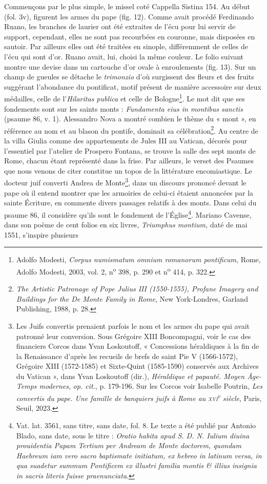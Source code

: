 \documentclass[12pt,twoside,openany]{book}
\begin{document}
Commençons par le plus simple, le missel coté Cappella Sistina 154. Au début (fol. 3v), figurent les armes du pape (fig. 12). Comme avait procédé Ferdinando Ruano, les branches de laurier ont été extraites de l’écu pour lui servir de support, cependant, elles ne sont pas recourbées en couronne, mais disposées en sautoir. Par ailleurs elles ont été traitées en sinople, différemment de celles de l’écu qui sont d’or. Ruano avait, lui, choisi la même couleur. Le folio suivant montre une devise dans un cartouche d’or ovale à enroulements (fig. 13). Sur un champ de gueules se détache le \textit{trimonzio} d’où surgissent des fleurs et des fruits suggérant l’abondance du pontificat, motif présent de manière accessoire sur deux médailles, celle de l’\textit{Hilaritas publica }et celle de Bologne\footnote{Adolfo Modesti, \textit{Corpus numismatum omnium romanorum pontificum}, Rome, Adolfo Modesti, 2003, vol. 2, n\textsuperscript{o} 398, p. 290 et n\textsuperscript{o} 414, p. 322.}. Le mot dit que ses fondements sont sur les saints monts : \textit{Fundamenta eius in montibus sanctis} (psaume 86, v. 1). Alessandro Nova a montré combien le thème du « mont », en référence au nom et au blason du pontife, dominait sa célébration\footnote{\textit{The Artistic Patronage of Pope Julius III (1550-1555), Profane Imagery and Buildings for the De Monte Family in Rome}, New York-Londres, Garland Publishing, 1988, p. 28.}. Au centre de la villa Giulia comme des appartements de Jules III au Vatican, décorés pour l’essentiel par l’atelier de Prospero Fontana, se trouve la salle des sept monts de Rome, chacun étant représenté dans la frise. Par ailleurs, le verset des Psaumes que nous venons de citer constitue un topos de la littérature encomiastique. Le docteur juif converti Andrea de Monte\footnote{Les Juifs convertis prenaient parfois le nom et les armes du pape qui avait patronné leur conversion. Sous Grégoire XIII Boncompagni, voir le cas des financiers Corcos dans Yvan Loskoutoff, « Concessions héraldiques à la fin de la Renaissance d’après les recueils de brefs de saint Pie V (1566-1572), Grégoire XIII (1572-1585) et Sixte-Quint (1585-1590) conservés aux Archives du Vatican », dans Yvan Loskoutoff (dir.), \textit{Héraldique et papauté. Moyen Âge-Temps modernes}, \textit{op. cit.}, p. 179-196. Sur les Corcos voir Isabelle Poutrin, \textit{Les convertis du pape. Une famille de banquiers juifs à Rome au }\textit{\textsc{xvi}}\textit{\textsuperscript{e}}\textit{ siècle}, Paris, Seuil, 2023.}, dans un discours prononcé devant le pape où il entend montrer que les armoiries de celui-ci étaient annoncées par la sainte Écriture, en commente divers passages relatifs à des monts. Dans celui du psaume 86, il considère qu’ils sont le fondement de l’Église\footnote{Vat. lat. 3561, sans titre, sans date, fol. 8. Le texte a été publié par Antonio Blado, sans date, sous le titre : \textit{Oratio habita apud S. D. N. Iulium diuina prouidentia Papam Tertium per Andream de Monte doctorem, quondam Haebreum iam vero sacro baptismate initiatum, ex hebreo in latinum versa, in qua suadetur summum Pontificem ex illustri familia montis \& illius insignia in sacris literis fuisse praenunciata}.}. Mariano Cavense, dans son poème de cent folios en six livres, \textit{Triumphus montium,} daté de mai 1551, s’inspire plusieurs 
\end{document}
